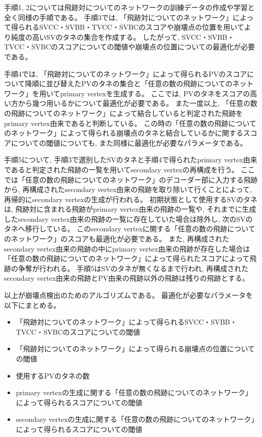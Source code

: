 手順1, 2については飛跡対についてのネットワークの訓練データの作成や学習と全く同様の手順である。
\newpage
手順3では, 「飛跡対についてのネットワーク」によって得られるSVCC・SVBB・TVCC・SVBCのスコアや崩壊点の位置を用いてより純度の高いSVのタネの集合を作成する。
したがって, SVCC・SVBB・TVCC・SVBCのスコアについての閾値や崩壊点の位置についての最適化が必要である。

手順4では, 「飛跡対についてのネットワーク」によって得られるPVのスコアについて降順に並び替えたPVのタネの集合と「任意の数の飛跡についてのネットワーク」を用いてprimary vertexを生成する。
ここでは, PVのタネをスコアの高い方から幾つ用いるかについて最適化が必要である。
また一度以上, 「任意の数の飛跡についてのネットワーク」によって結合していると判定された飛跡をprimary vertex由来であると判断している。
この時の「任意の数の飛跡についてのネットワーク」によって得られる崩壊点のタネと結合しているかに関するスコアについての閾値についても, また同様に最適化が必要なパラメータである。

手順5について, 手順3で選別したSVのタネと手順4で得られたprimary vertex由来であると判定された飛跡の一覧を用いてsecondary vertexの再構成を行う。
ここでは「任意の数の飛跡についてのネットワーク」のデコーダー部に入力する飛跡から, 再構成されたsecondary vertex由来の飛跡を取り除いて行くことによって, 再帰的にsecondary vertexの生成が行われる。
初期状態として使用するSVのタネは, 飛跡対に含まれる飛跡がprimary vertex由来の飛跡の一覧や, それまでに生成したsecondary vertex由来の飛跡の一覧に存在していた場合は除外し, 次のSVのタネへ移行している。
このsecondary vertexに関する「任意の数の飛跡についてのネットワーク」のスコアも最適化が必要である。
また, 再構成されたsecondary vertex由来の飛跡の中にprimary vertex由来の飛跡が存在した場合は「任意の数の飛跡についてのネットワーク」によって得られたスコアによって飛跡の争奪が行われる。
手順5はSVのタネが無くなるまで行われ, 再構成されたsecondary vertex由来の飛跡とPV由来の飛跡以外の飛跡は残りの飛跡とする。

以上が崩壊点検出のためのアルゴリズムである。
最適化が必要なパラメータを以下にまとめる。

\begin{itemize}
 \item 「飛跡対についてのネットワーク」によって得られるSVCC・SVBB・TVCC・SVBCのスコアについての閾値
 \item 「飛跡対についてのネットワーク」によって得られる崩壊点の位置についての閾値
 \item 使用するPVのタネの数
 \item primary vertexの生成に関する「任意の数の飛跡についてのネットワーク」によって得られるスコアについての閾値
 \item secondary vertexの生成に関する「任意の数の飛跡についてのネットワーク」によって得られるスコアについての閾値
\end{itemize}

